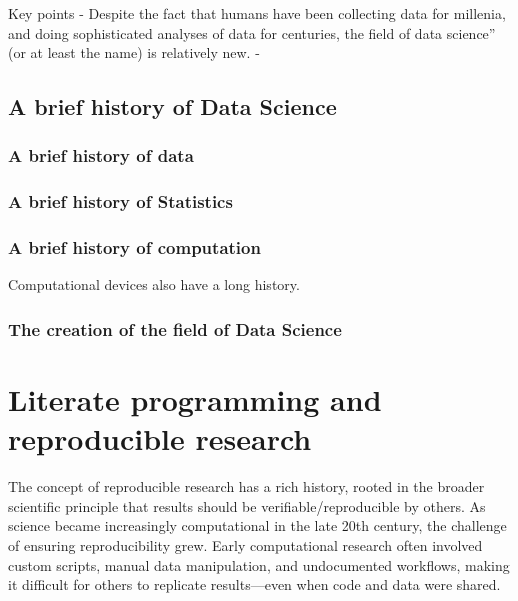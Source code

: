 \documentclass[
  letterpaper,
  DIV=11,
  numbers=noendperiod]{scrreprt}
\begin{document}
Key points - Despite the fact that humans have been collecting data for
millenia, and doing sophisticated analyses of data for centuries, the
field of data science'' (or at least the name) is relatively new. -

\section{A brief history of Data
Science}\label{a-brief-history-of-data-science}

\subsection{A brief history of data}\label{a-brief-history-of-data}

\subsection{A brief history of
Statistics}\label{a-brief-history-of-statistics}

\subsection{A brief history of
computation}\label{a-brief-history-of-computation}

Computational devices also have a long history.

\subsection{The creation of the field of Data
Science}\label{the-creation-of-the-field-of-data-science}


\chapter{Literate programming and reproducible
research}\label{literate-programming-and-reproducible-research}

The concept of reproducible research has a rich history, rooted in the
broader scientific principle that results should be
verifiable/reproducible by others. As science became increasingly
computational in the late 20th century, the challenge of ensuring
reproducibility grew. Early computational research often involved custom
scripts, manual data manipulation, and undocumented workflows, making it
difficult for others to replicate results---even when code and data were
shared.
\end{document}
